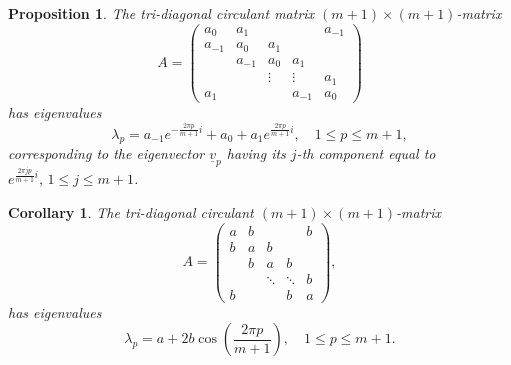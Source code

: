 \documentclass{article}
\newtheorem{corollary}{Corollary}
\newtheorem{proposition}{Proposition}
\begin{document}
\begin{proposition}
    The tri-diagonal circulant matrix $(m+1)\times(m+1)$-matrix
    \begin{equation}
        A =
        \begin{pmatrix}
            a_0 & a_1 & & & a_{-1} \\
            a_{-1} & a_0 & a_1 & & \\
            & a_{-1} & a_0 & a_1 & \\
            & & \vdots & \vdots & a_1 \\
            a_1 & & & a_{-1} & a_0 
        \end{pmatrix} \nonumber
    \end{equation}
    has eigenvalues
    \begin{equation}
        \lambda_p = a_{-1}e^{-\frac{2\pi p}{m+1}i} + a_0 + a_1 e^{\frac{2\pi p}{m+1}i},\quad 1\leq p\leq m+1,
    \end{equation}
    corresponding to the eigenvector $\underline{v}_p$ having its $j$-th component equal to $e^{\frac{2\pi jp}{m+1}i},\,1\leq j\leq m+1$. 
\end{proposition}
\begin{corollary}
    The tri-diagonal circulant $(m+1)\times(m+1)$-matrix 
    \begin{equation}
        A =
        \begin{pmatrix}
            a & b & & & b \\
            b & a & b & & \\
            & b & a & b & \\
            & & \ddots & \ddots & b \\
            b & & & b & a 
        \end{pmatrix}, \nonumber
    \end{equation}
    has eigenvalues
    \begin{equation}
        \lambda_p = a+2b\cos{\left( \frac{2\pi p}{m+1} \right)},\quad 1\leq p\leq m+1.
    \end{equation}
\end{corollary}
\end{document}
